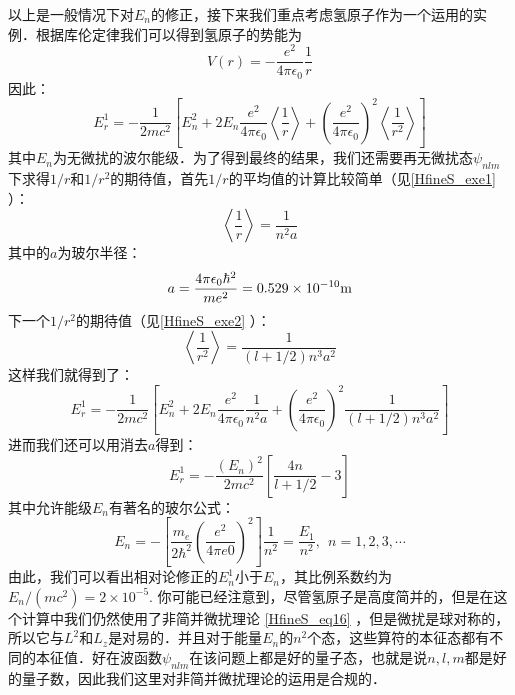 以上是一般情况下对$E_n$的修正，接下来我们重点考虑氢原子作为一个运用的实例．根据库伦定律我们可以得到氢原子的势能为
\begin{equation}
V(r)=-\frac{e^2}{4\pi\epsilon_0}\frac{1}{r}
\end{equation}
因此：
\begin{equation}
E_r^1=-\frac{1}{2mc^2}\left[E_n^2+2E_n\frac{e^2}{4\pi\epsilon_0}\left\langle \frac{1}{r}\right\rangle+\left(\frac{e^2}{4\pi\epsilon_0}\right)^2\left\langle \frac{1}{r^2}\right\rangle\right]
\end{equation}
其中$E_n$为无微扰的波尔能级．为了得到最终的结果，我们还需要再无微扰态$\psi_{nlm}$下求得$1/r$和$1/r^2$的期待值，首先$1/r$的平均值的计算比较简单（见\autoref{HfineS_exe1} ）：
\begin{equation}
\left\langle\frac{1}{r}\right\rangle = \frac{1}{n^2a}
\end{equation}
其中的$a$为玻尔半径：
\begin{equation}
a=\frac{4\pi\epsilon_0\hbar^2}{me^2}=0.529\times 10^{-10}\rm{m}
\end{equation}
下一个$1/r^2$的期待值（见\autoref{HfineS_exe2} ）：
\begin{equation}
\left\langle \frac{1}{r^2}\right\rangle = \frac{1}{(l+1/2)n^3a^2}
\end{equation}
这样我们就得到了：
\begin{equation}
E_r^1=-\frac{1}{2mc^2}\left[E_n^2+2E_n\frac{e^2}{4\pi\epsilon_0}\frac{1}{n^2a}+\left(\frac{e^2}{4\pi\epsilon_0}\right)^2\frac{1}{(l+1/2)n^3a^2}\right]
\end{equation}
进而我们还可以用消去$a$得到：
\begin{equation}\label{HfineS_eq21}
E_r^1=-\frac{(E_n)^2}{2mc^2}\left[\frac{4n}{l+1/2}-3\right]
\end{equation}
其中允许能级$E_n$有著名的玻尔公式：
\begin{equation}
E_{n} =-\left[\frac {m_e}{2\hbar^{2}} \left(\frac {e^ {2}}{4\pi e0}\right)^ {2}\right]  \frac {1}{n^ {2}}  =  \frac {E_ {1}}{n^ {2}}, \ \  n=1,2,3, \cdots 
\end{equation}
由此，我们可以看出相对论修正的$E^1_n$小于$E_n$，其比例系数约为$E_n/(mc^2)=2\times 10^{-5}$.
你可能已经注意到，尽管氢原子是高度简并的，但是在这个计算中我们仍然使用了非简并微扰理论 \autoref{HfineS_eq16} ，但是微扰是球对称的，所以它与$L^2$和$L_z$是对易的．并且对于能量$E_n$的$n^2$个态，这些算符的本征态都有不同的本征值．好在波函数$\psi_{nlm}$在该问题上都是好的量子态，也就是说$n,l,m$都是好的量子数，因此我们这里对非简并微扰理论的运用是合规的．

